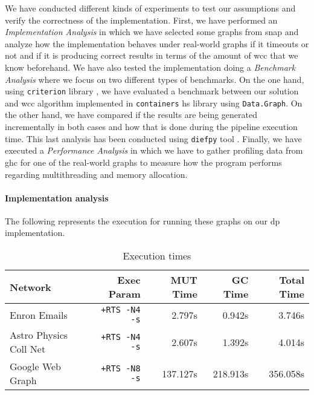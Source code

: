We have conducted different kinds of experiments to test our assumptions and verify the correctness of the implementation.
First, we have performed an \emph{Implementation Analysis} in which we have selected some graphs from \acrfull{snap} \cite{stanford} 
and analyze how the implementation behaves under real-world graphs if it timeouts or not and if it is producing correct results in terms of the amount of \acrshort{wcc} that we know beforehand.
We have also tested the implementation doing a \emph{Benchmark Analysis} where we focus on two different types of benchmarks. On the one hand, 
using \texttt{criterion} library \cite{criterion}, we have evaluated a benchmark between our solution and \acrshort{wcc} algorithm implemented in \texttt{containers} \acrshort{hs} library \cite{containers} 
using \texttt{Data.Graph}. On the other hand, we have compared if the results are being generated incrementally in both cases and how that is done during the pipeline execution time. 
This last analysis has been conducted using \texttt{diefpy} tool \cite{diefpaper,diefpy}.
Finally, we have executed a \textit{Performance Analysis} in which we have to gather profiling data from \acrfull{ghc} for one of the real-world graphs to measure how the program performs regarding multithreading and memory allocation.

\paragraph{Implementation analysis} The following represents the execution for running these graphs on our \acrshort{dp} implementation.

\begin{table}[H]
  \centering
  \begin{tabular}{|l|r|r|r|r|}
   \hline
   \textbf{Network} & \textbf{Exec Param} & \textbf{MUT Time} & \textbf{GC Time} & \textbf{Total Time}\\
   \hline
   Enron Emails & \texttt{+RTS -N4 -s} & 2.797s & 0.942s & 3.746s \\
   \hline
   Astro Physics Coll Net & \texttt{+RTS -N4 -s} & 2.607s & 1.392s & 4.014s \\
   \hline
   Google Web Graph & \texttt{+RTS -N8 -s} & 137.127s & 218.913s & 356.058s \\
   \hline
  \end{tabular}
 \caption{Execution times}
 \label{table:5}
 \end{table}

